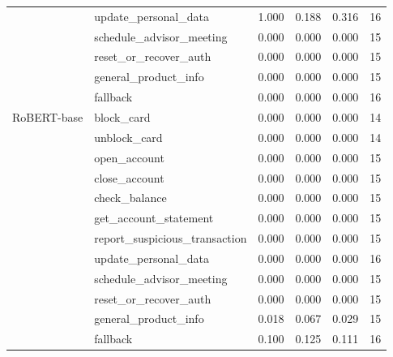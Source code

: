 \begin{table}[H]
\begin{tabular}{llcccc}
 & update\_personal\_data & 1.000 & 0.188 & 0.316 & 16 \\
 & schedule\_advisor\_meeting & 0.000 & 0.000 & 0.000 & 15 \\
 & reset\_or\_recover\_auth & 0.000 & 0.000 & 0.000 & 15 \\
 & general\_product\_info & 0.000 & 0.000 & 0.000 & 15 \\
 & fallback & 0.000 & 0.000 & 0.000 & 16 \\
\midrule
RoBERT-base & block\_card & 0.000 & 0.000 & 0.000 & 14 \\
 & unblock\_card & 0.000 & 0.000 & 0.000 & 14 \\
 & open\_account & 0.000 & 0.000 & 0.000 & 15 \\
 & close\_account & 0.000 & 0.000 & 0.000 & 15 \\
 & check\_balance & 0.000 & 0.000 & 0.000 & 15 \\
 & get\_account\_statement & 0.000 & 0.000 & 0.000 & 15 \\
 & report\_suspicious\_transaction & 0.000 & 0.000 & 0.000 & 15 \\
 & update\_personal\_data & 0.000 & 0.000 & 0.000 & 16 \\
 & schedule\_advisor\_meeting & 0.000 & 0.000 & 0.000 & 15 \\
 & reset\_or\_recover\_auth & 0.000 & 0.000 & 0.000 & 15 \\
 & general\_product\_info & 0.018 & 0.067 & 0.029 & 15 \\
 & fallback & 0.100 & 0.125 & 0.111 & 16 \\
\bottomrule
\end{tabular}
\end{table}
